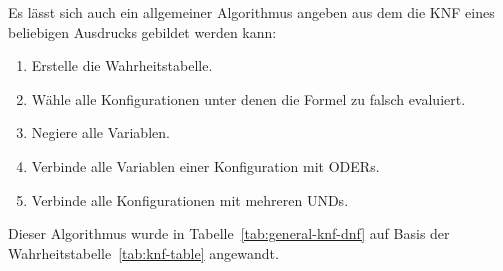 Es lässt sich auch ein allgemeiner Algorithmus angeben aus dem die KNF eines beliebigen Ausdrucks gebildet werden kann:
\begin{enumerate}
 \item Erstelle die Wahrheitstabelle.
 \item Wähle alle Konfigurationen unter denen die Formel zu falsch evaluiert.
 \item Negiere alle Variablen.
 \item Verbinde alle Variablen einer Konfiguration mit ODERs.
 \item Verbinde alle Konfigurationen mit mehreren UNDs.
\end{enumerate}
Dieser Algorithmus wurde in Tabelle~\ref{tab:general-knf-dnf} auf Basis der Wahrheitstabelle~\ref{tab:knf-table} angewandt.
%
